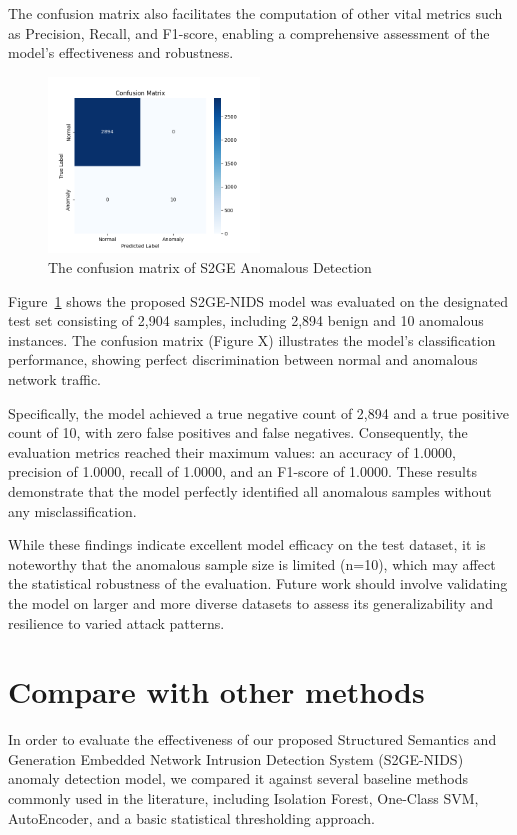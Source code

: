 \begin{ZhChapter}
    The confusion matrix also facilitates the computation of other vital metrics such as Precision, Recall, and F1-score, enabling a comprehensive assessment of the model's effectiveness and robustness.

    \begin{figure}[htbp]
        \centering
        \includegraphics[width = 0.5\textwidth]{image/confusion_matrix.png}
        \caption{The confusion matrix of S2GE Anomalous Detection}
        \label{fig:confusion_matrix}
    \end{figure}



    Figure~\ref{fig:confusion_matrix} shows the proposed S2GE-NIDS model was evaluated on the designated test set consisting of 2,904 samples, including 2,894 benign and 10 anomalous instances. The confusion matrix (Figure X) illustrates the model's classification performance, showing perfect discrimination between normal and anomalous network traffic.

    Specifically, the model achieved a true negative count of 2,894 and a true positive count of 10, with zero false positives and false negatives. Consequently, the evaluation metrics reached their maximum values: an accuracy of 1.0000, precision of 1.0000, recall of 1.0000, and an F1-score of 1.0000. These results demonstrate that the model perfectly identified all anomalous samples without any misclassification.

    While these findings indicate excellent model efficacy on the test dataset, it is noteworthy that the anomalous sample size is limited (n=10), which may affect the statistical robustness of the evaluation. Future work should involve validating the model on larger and more diverse datasets to assess its generalizability and resilience to varied attack patterns.



    \section{Compare with other methods}
    In order to evaluate the effectiveness of our proposed Structured Semantics and Generation Embedded Network Intrusion Detection System (S2GE-NIDS) anomaly detection model, we compared it against several baseline methods commonly used in the literature, including Isolation Forest, One-Class SVM, AutoEncoder, and a basic statistical thresholding approach.




\end{ZhChapter}
